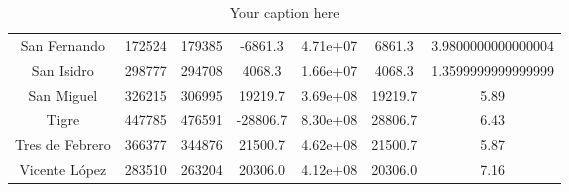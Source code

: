 \begin{table}[htb]
\begin{tabular}{|c|c|c|c|c|c|c|}
San Fernando & 172524 & 179385 & -6861.3 & 4.71e+07 & 6861.3 & 3.9800000000000004 \\
San Isidro & 298777 & 294708 & 4068.3 & 1.66e+07 & 4068.3 & 1.3599999999999999 \\
San Miguel & 326215 & 306995 & 19219.7 & 3.69e+08 & 19219.7 & 5.89 \\
Tigre & 447785 & 476591 & -28806.7 & 8.30e+08 & 28806.7 & 6.43 \\
Tres de Febrero & 366377 & 344876 & 21500.7 & 4.62e+08 & 21500.7 & 5.87 \\
Vicente López & 283510 & 263204 & 20306.0 & 4.12e+08 & 20306.0 & 7.16 \\
\hline
\end{tabular}
\caption{Your caption here}
\label{tab:my_table}
\end{table}
